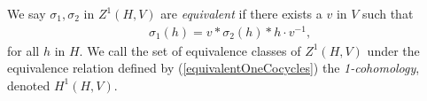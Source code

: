 

We say $\sigma_1, \sigma_2$ in $Z^1(H, V)$ are \emph{equivalent} if there exists a $v$ in $V$ such that
\begin{eqnarray}\label{equivalentOneCocycles}
	\sigma_1(h) = v * \sigma_2(h) * h\cdot v^{-1},
\end{eqnarray}
for all $h$ in $H$. We call the set of equivalence classes of $Z^1(H, V)$ under the equivalence relation defined by (\ref{equivalentOneCocycles}) the \emph{1-cohomology}, denoted $H^1(H, V)$.

